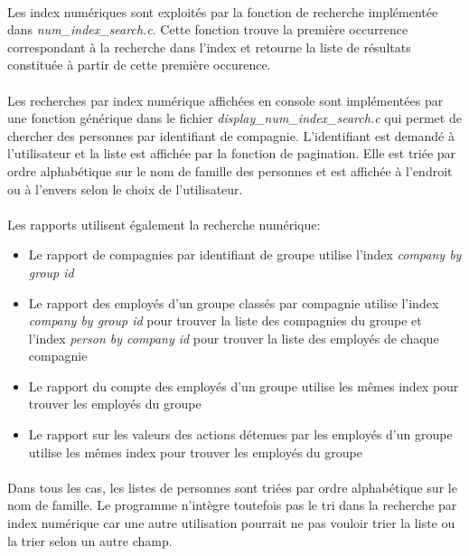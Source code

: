 \documentclass{article}
\begin{document}
    \paragraph{}
    Les index numériques sont exploités par la fonction de recherche implémentée dans \emph{num\_index\_search.c}. Cette fonction trouve la première occurrence correspondant à la recherche dans l'index et retourne la liste de résultats constituée à partir de cette première occurence.

    \paragraph{}
    Les recherches par index numérique affichées en console sont implémentées par une fonction générique dans le fichier \emph{display\_num\_index\_search.c} qui permet de chercher des personnes par identifiant de compagnie. L'identifiant est demandé à l'utilisateur et la liste est affichée par la fonction de pagination. Elle est triée par ordre alphabétique sur le nom de famille des personnes et est affichée à l'endroit ou à l'envers selon le choix de l'utilisateur.

    \paragraph{}
    Les rapports utilisent également la recherche numérique:
    \begin{itemize}[label=$\bullet$]
        \item Le rapport de compagnies par identifiant de groupe utilise l'index \emph{company by group id}
        \item Le rapport des employés d'un groupe classés par compagnie utilise l'index \emph{company by group id} pour trouver la liste des compagnies du groupe et l'index \emph{person by company id} pour trouver la liste des employés de chaque compagnie
        \item Le rapport du compte des employés d'un groupe utilise les mêmes index pour trouver les employés du groupe
        \item Le rapport sur les valeurs des actions détenues par les employés d'un groupe utilise les mêmes index pour trouver les employés du groupe
    \end{itemize}

    \paragraph{}
    Dans tous les cas, les listes de personnes sont triées par ordre alphabétique sur le nom de famille. Le programme n'intègre toutefois pas le tri dans la recherche par index numérique car une autre utilisation pourrait ne pas vouloir trier la liste ou la trier selon un autre champ.
\end{document}
